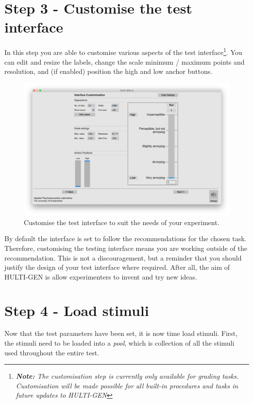 \section{Step 3 - Customise the test interface}

In this step you are able to customise various aspects of the test interface\footnote{\textit{\textbf{Note:} The customisation step is currently only available for grading tasks. Customisation will be made possible for all built-in procedures and tasks in future updates to HULTI-GEN}}. You can edit and resize the labels, change the scale minimum / maximum points and resolution, and (if enabled) position the high and low anchor buttons.

\begin{figure}[ht]
	\centering
	\includegraphics[width=1.0\textwidth]{./images/createTest_step04_customisation.png}
	\caption{Customise the test interface to suit the needs of your experiment.}
	\label{create::customisation}
\end{figure}

\noindent
By default the interface is set to follow the recommendations for the chosen task. Therefore, customising the testing interface means you are working outside of the recommendation. This is not a discouragement, but a reminder that you should justify the design of your test interface where required. After all, the aim of HULTI-GEN is allow experimenters to invent and try new ideas.
\pagebreak

\section{Step 4 - Load stimuli}
Now that the test parameters have been set, it is now time load stimuli. First, the stimuli need to be loaded into a \emph{pool}, which is collection of all the stimuli used throughout the entire test.

